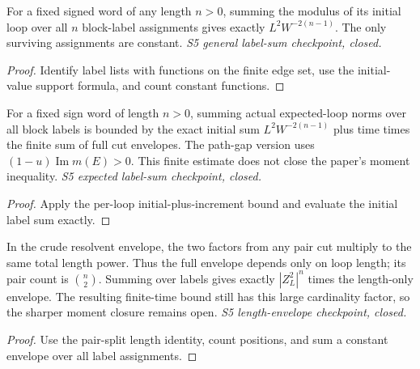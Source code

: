\begin{lemma}
  \label{lem:loop-initial-general-label-sum}
  \leanok
  For a fixed signed word of any length $n>0$, summing the modulus of
  its initial loop over all $n$ block-label assignments gives exactly
  $L^2W^{-2(n-1)}$. The only surviving assignments are constant.
  \emph{S5 general label-sum checkpoint, closed.}
\end{lemma}
\begin{proof}\leanok
  Identify label lists with functions on the finite edge set, use the
  initial-value support formula, and count constant functions.
\end{proof}

\begin{lemma}
  \label{lem:loop-hierarchy-initial-average-bound}
  \leanok
  For a fixed sign word of length $n>0$, summing actual expected-loop
  norms over all block labels is bounded by the exact initial sum
  $L^2W^{-2(n-1)}$ plus time times the finite sum of full cut envelopes.
  The path-gap version uses $(1-u)\operatorname{Im}m(E)>0$.
  This finite estimate does not close the paper's moment inequality.
  \emph{S5 expected label-sum checkpoint, closed.}
\end{lemma}
\begin{proof}\leanok
  Apply the per-loop initial-plus-increment bound and evaluate the
  initial label sum exactly.
\end{proof}

\begin{lemma}
  \label{lem:loop-hierarchy-envelope-label-sum}
  \leanok
  In the crude resolvent envelope, the two factors from any pair cut
  multiply to the same total length power. Thus the full envelope
  depends only on loop length; its pair count is $\binom n2$.
  Summing over labels gives exactly $|Z_L^2|^n$ times the length-only
  envelope. The resulting finite-time bound still has this large
  cardinality factor, so the sharper moment closure remains open.
  \emph{S5 length-envelope checkpoint, closed.}
\end{lemma}
\begin{proof}\leanok
  Use the pair-split length identity, count positions, and sum a
  constant envelope over all label assignments.
\end{proof}

